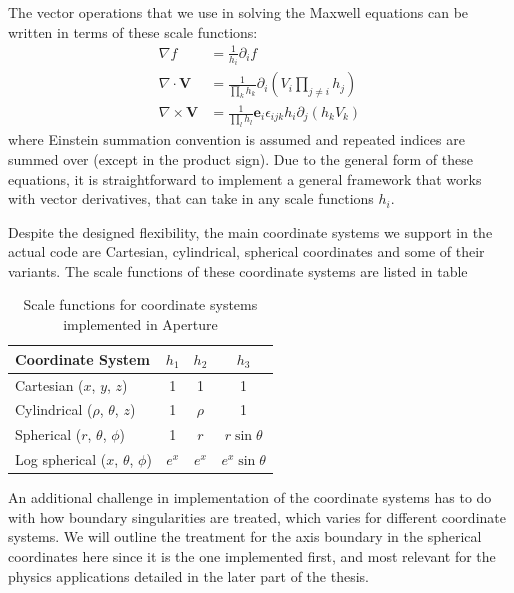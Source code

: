 The vector operations that we use in solving the Maxwell equations can be
written in terms of these scale functions:
\begin{align}
  \label{eq:vector-derivatives}
  \nabla f &= \frac{1}{h_{i}}\partial_{i}f \\
  \nabla \cdot \mathbf{V} &= \frac{1}{\prod_{k}h_{k}}\partial_i(V_i\prod_{j\neq i}h_{j}) \\
  \nabla \times \mathbf{V} &= \frac{1}{\prod_lh_l}\mathbf{e}_{i}\epsilon_{ijk}h_i\partial_j(h_kV_k)
\end{align}
where Einstein summation convention is assumed and repeated indices are summed
over (except in the product sign). Due to the general form of these equations,
it is straightforward to implement a general framework that works with vector
derivatives, that can take in any scale functions $h_{i}$.

Despite the designed flexibility, the main coordinate systems we support in the
actual code are Cartesian, cylindrical, spherical coordinates and some of their
variants. The scale functions of these coordinate systems are listed in table

\begin{table}[h]
  \centering
  \begin{tabular}{lccc}
    \hline
    Coordinate System & $h_1$ & $h_2$ & $h_3$ \\ \hline
    Cartesian ($x$, $y$, $z$) & 1 & 1 & 1 \\ \hline
    Cylindrical ($\rho$, $\theta$, $z$) & 1 & $\rho$ & 1 \\ \hline
    Spherical ($r$, $\theta$, $\phi$) & 1 & $r$ & $r\sin\theta$ \\ \hline
    Log spherical ($x$, $\theta$, $\phi$) & $e^x$ & $e^{x}$ & $e^x\sin\theta$ \\ \hline
  \end{tabular}
  \caption{Scale functions for coordinate systems implemented in Aperture}
  \label{tab:scale-functions}
\end{table}

An additional challenge in implementation of the coordinate systems
has to do with how boundary singularities are treated, which varies for
different coordinate systems. We will outline the treatment for the axis
boundary in the spherical coordinates here since it is the one implemented
first, and most relevant for the physics applications detailed in the later part
of the thesis.

